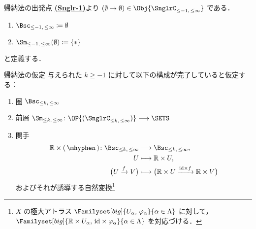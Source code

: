 \documentclass[TQFT_main]{subfiles}
\begin{document}
\begin{mydef}[label=def:induction-init]{帰納法の出発点}
    \hyperref[def:Snglr-C0]{\textsf{\textbf{(Snglr-1)}}}より $(\emptyset \to \emptyset) \in \Obj{\SnglrC_{\le -1,\, \le \infty}}$ である．
    \begin{enumerate}
        \item $\Bsc_{\le -1,\, \le \infty} \coloneqq \emptyset$
        \item $\Sm_{\le -1,\, \le \infty}(\emptyset) \coloneqq \{*\}$
    \end{enumerate}
    と定義する．
\end{mydef}

\begin{myassump}[label=assump:induction-Bsc-Sm]{帰納法の仮定}
    与えられた $k \ge -1$ に対して以下の構成が完了していると仮定する：
    \begin{enumerate}
        \item 圏 $\Bsc_{\le k,\, \le \infty}$
        \item 前層 $\Sm_{\le k,\, \le \infty} \colon \OP{(\SnglrC_{\le k,\, \le \infty})} \lto \SETS$
        \item 関手
        \begin{align}
            \mathbb{R} \times (\, \mhyphen \,) \colon \Bsc_{\le k,\, \le \infty} &\lto \Bsc_{\le k,\, \le \infty}, \\
            U &\lmto \mathbb{R} \times U, \\
            \bigl( U \xrightarrow{f} V \bigr) &\lmto \bigl( \mathbb{R} \times U \xrightarrow{\mathrm{id} \times f} \mathbb{R} \times V \bigr) 
        \end{align}
        およびそれが誘導する自然変換\footnote{$X$ の極大アトラス $\Familyset[big]{U_\alpha,\, \varphi_\alpha}{\alpha \in \Lambda}$ に対して，$\Familyset[big]{\mathbb{R} \times U_\alpha,\, \mathrm{id} \times \varphi_\alpha}{\alpha \in \Lambda}$ を対応づける．}
        \begin{center}
        \end{center}
    \end{enumerate}
\end{myassump}
\end{document}
